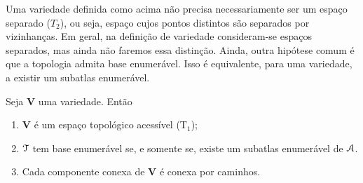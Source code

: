 Uma variedade definida como acima não precisa necessariamente ser um espaço separado ($T_2$), ou seja, espaço cujos pontos distintos são separados por vizinhanças. Em geral, na definição de variedade consideram-se espaços separados, mas ainda não faremos essa distinção. Ainda, outra hipótese comum é que a topologia admita base enumerável. Isso é equivalente, para uma variedade, a existir um subatlas enumerável.

\begin{prop}
Seja $\bm V$ uma variedade. Então
	\begin{enumerate}
	\item $\bm V$  é um espaço topológico acessível (T$_1$);
	\item $\mathcal{T}$ tem base enumerável se, e somente se, existe um subatlas enumerável de $\mathcal{A}$.
	\item Cada componente conexa de $\bm V$ é conexa por caminhos.
	\end{enumerate}
\end{prop}
